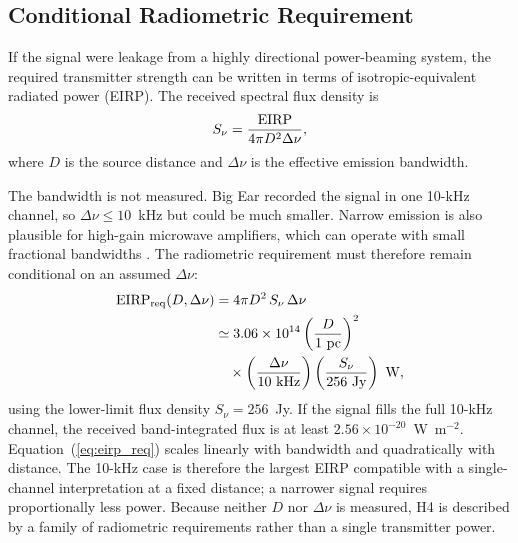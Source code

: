 \documentclass[crop]{CSL}
\newcommand{\snu}{S_\nu}
\begin{document}
\subsection{Conditional Radiometric Requirement}

If the signal were leakage from a highly directional power-beaming system, the required transmitter strength can be written in terms of isotropic-equivalent radiated power (EIRP). The received spectral flux density is
\begin{equation}
\snu=
\frac{{\rm EIRP}}
{4\pi D^2\Delta\nu},
\label{eq:eirp}
\end{equation}
where $D$ is the source distance and $\Delta\nu$ is the effective emission bandwidth.

The bandwidth is not measured. Big Ear recorded the signal in one 10-kHz channel, so $\Delta\nu\leq10$~kHz but could be much smaller. Narrow emission is also plausible for high-gain microwave amplifiers, which can operate with small fractional bandwidths \citep{benford2025}. The radiometric requirement must therefore remain conditional on an assumed $\Delta\nu$:
\begin{equation}
\begin{split}
{\rm EIRP}_{\rm req}(D,\Delta\nu)
&=
4\pi D^2\,\snu\,\Delta\nu \\
&\simeq
3.06\times10^{14}
\left(\frac{D}{1~{\rm pc}}\right)^2 \\
&\quad\times
\left(\frac{\Delta\nu}{10~{\rm kHz}}\right)
\left(\frac{\snu}{256~{\rm Jy}}\right)
~{\rm W},
\end{split}
\label{eq:eirp_req}
\end{equation}
using the lower-limit flux density $\snu=256$~Jy. If the signal fills the full 10-kHz channel, the received band-integrated flux is at least $2.56\times10^{-20}$~W~m$^{-2}$. Equation~(\ref{eq:eirp_req}) scales linearly with bandwidth and quadratically with distance. The 10-kHz case is therefore the largest EIRP compatible with a single-channel interpretation at a fixed distance; a narrower signal requires proportionally less power. Because neither $D$ nor $\Delta\nu$ is measured, H4 is described by a family of radiometric requirements rather than a single transmitter power.
\end{document}
